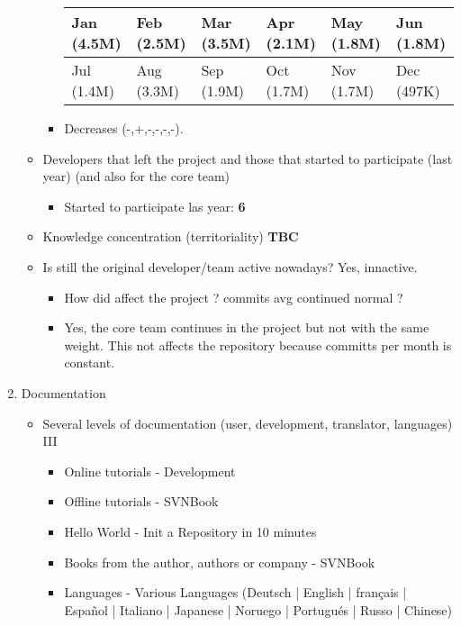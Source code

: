 \documentclass[11pt]{scrartcl}
\begin{document}
\begin{enumerate}
\begin{itemize}
\begin{itemize}
                \begin{tabular}{|l|l|l|l|l|l|}
                    \hline
            	    Jan (4.5M) & Feb (2.5M) & Mar (3.5M) & Apr (2.1M) & May (1.8M) & Jun (1.8M)\\
                    \hline
                    Jul (1.4M) & Aug (3.3M) & Sep (1.9M) & Oct (1.7M) & Nov (1.7M) & Dec (497K)\\
                    \hline
                \end{tabular}
            \item Decreases (-,+,-,-,-,-).
        \end{itemize}
	    \item Developers that left the project and those that started to participate (last year) (and also for the core team)
	    \begin{itemize}
            \item Started to participate las year: \textbf{6}
        \end{itemize}
	    \item Knowledge concentration (territoriality) \textbf{TBC}
	    \item Is still the original developer/team active nowadays? Yes, innactive.
	    \begin{itemize}
            \item How did affect the project ? commits avg continued normal ?
            \item Yes, the core team continues in the project but not with the same weight. This not affects the repository because committs per month is constant.
        \end{itemize}
    \end{itemize}

    \item Documentation
    \begin{itemize}
 	    \item Several levels of documentation (user, development, translator, languages) III
     	    \begin{itemize}
                \item Online tutorials - Development
                \item Offline tutorials - SVNBook
                \item Hello World - Init a Repository in 10 minutes
                \item Books from the author, authors or company - SVNBook
                \item Languages - Various Languages (Deutsch | English | français | Espa\~nol | Italiano | Japanese | Noruego | Portugu\'es | Russo | Chinese)
            \end{itemize}
    \end{itemize}

\end{enumerate}
\end{document}
